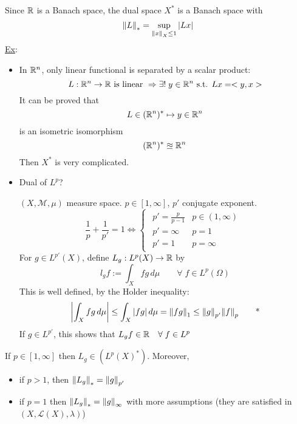 Since \(\mathbb{R}\) is a Banach space, the dual space \(X^*\) is a Banach space with 
\[
    \norm{L}_* = \sup_{\norm{x}_X \leq 1} \abs{Lx}
\]
\underline{Ex}: 
\begin{itemize}
    \item In \(\mathbb{R}^n\), only linear functional is separated by a scalar product:
        \[
            L : \mathbb{R}^n \to \mathbb{R} \mbox{ is linear } \Rightarrow \exists ! \; y \in \mathbb{R}^n \mbox{ s.t. } Lx = <y,x>
        \]
        It can be proved that 
        \[
            L \in (\mathbb{R}^n)^* \mapsto y \in \mathbb{R}^n
        \]
        is an isometric isomorphism 
        \[
            (\mathbb{R}^n)^* \approxeq \mathbb{R}^n
        \]
        Then \(X^*\) is very complicated.
    \item Dual of \(L^p\)?
    
    \(\left(X, \mathcal{M}, \mu\right)\) measure space. \(p \in \left[1, \infty\right]\), \(p'\) conjugate exponent.
    \[
        \frac{1}{p} + \frac{1}{p'} = 1 \iff 
        \begin{cases}
            \begin{array}{ll}
                p' = \frac{p}{p-1} & p \in (1, \infty) \\
                p' = \infty & p = 1 \\
                p'=1 & p = \infty
            \end{array}     
        \end{cases}
    \]
    For \(g \in L^{p'}(X)\), define \(L_g : L^p(X) \to \mathbb{R}\) by
    \[
        l_g f := \int_X fg \, d\mu \qquad \forall \; f \in L^p(\Omega)
    \]
    This is well defined, by the Holder inequality:
    \[
        \abs{\int_X fg \, d\mu } \leq \int_X \abs{fg} \, d\mu = \norm{fg}_1 \leq \norm{g}_{p'} \norm{f}_p \tag*{*} 
    \]
    If \(g \in L^{p'}\), this shows that \(L_g f \in \mathbb{R} \quad \forall \; f \in L^p\)
\end{itemize}

\begin{proposition}
    If \(p \in [1, \infty]\) then \(L_g \in (L^p(X)^*)\). Moreover, 
    \begin{itemize}
        \item if \(p > 1\), then \(\norm{L_g}_* = \norm{g}_{p'}\)
        \item if \(p=1\) then \(\norm{L_g}_* = \norm{g}_{\infty}\) with more assumptions (they are satisfied in \((X, \mathcal{L}(X), \lambda)\))
    \end{itemize}
\end{proposition}


